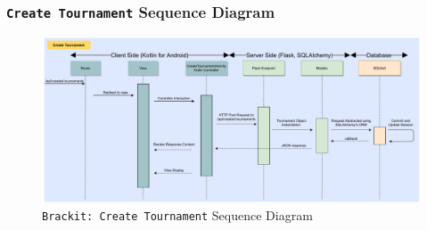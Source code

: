\documentclass{article}
\begin{document}
\subsubsection{\texttt{Create Tournament} Sequence Diagram}
\vfill
\begin{center}
    \begin{figure}[htp]
        \centering
        \includegraphics[width=16cm]{../diagrams/sequence.pdf}
        \caption{\texttt{Brackit: Create Tournament} Sequence Diagram}
        \end{figure}
\end{center}
\vfill

\clearpage
\end{document}
